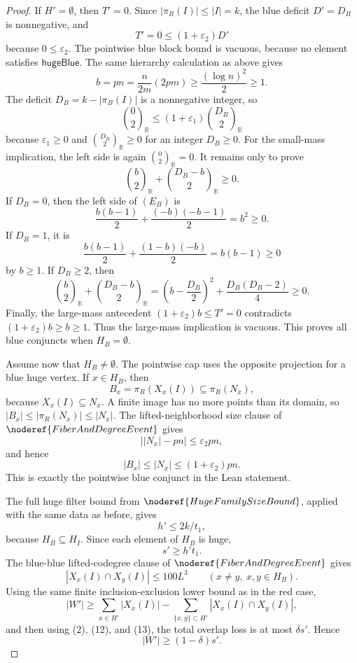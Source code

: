 \begin{proof}
If \(H'=\emptyset\), then \(T'=0\).  Since
\(|\pi_B(I)|\le |I|=k\), the blue deficit \(D'=D_B\) is nonnegative, and
\[
T'=0\le(1+\varepsilon_2)D'
\]
because \(0\le\varepsilon_2\).  The pointwise blue block bound is vacuous,
because no element satisfies \(\mathsf{hugeBlue}\).  The same hierarchy
calculation as above gives
\[
b=pn=\frac{n}{2m}(2pm)\ge\frac{(\log n)^2}{2}\ge1.
\]
The deficit \(D_B=k-|\pi_B(I)|\) is a nonnegative integer, so
\[
\binom{0}{2}_{\mathbb R}
\le(1+\varepsilon_1)\binom{D_B}{2}_{\mathbb R}
\]
because \(\varepsilon_1\ge0\) and
\(\binom{D_B}{2}_{\mathbb R}\ge0\) for an integer \(D_B\ge0\).
For the small-mass implication, the left side is again
\(\binom02_{\mathbb R}=0\).  It remains only to prove
\[
\binom b2_{\mathbb R}+\binom{D_B-b}{2}_{\mathbb R}\ge0. \tag{E_B}
\]
If \(D_B=0\), then the left side of \((E_B)\) is
\[
\frac{b(b-1)}2+\frac{(-b)(-b-1)}2=b^2\ge0.
\]
If \(D_B=1\), it is
\[
\frac{b(b-1)}2+\frac{(1-b)(-b)}2=b(b-1)\ge0
\]
by \(b\ge1\).  If \(D_B\ge2\), then
\[
\binom b2_{\mathbb R}+\binom{D_B-b}{2}_{\mathbb R}
=\left(b-\frac{D_B}{2}\right)^2+\frac{D_B(D_B-2)}4\ge0.
\]
Finally, the large-mass antecedent
\((1+\varepsilon_2)b\le T'=0\) contradicts
\((1+\varepsilon_2)b\ge b\ge1\).  Thus the large-mass implication is
vacuous.  This proves all blue conjuncts when \(H_B=\emptyset\).

Assume now that \(H_B\ne\emptyset\).  The pointwise cap uses the opposite
projection for a blue huge vertex.  If \(x\in H_B\), then
\[
B_x=\pi_R(X_x(I))\subseteq \pi_R(N_x),
\]
because \(X_x(I)\subseteq N_x\).  A finite image has no more points than its
domain, so \(|B_x|\le |\pi_R(N_x)|\le |N_x|\).  The lifted-neighborhood size
clause of \(\noderef{FiberAndDegreeEvent}\) gives
\[
\bigl||N_x|-pn\bigr|\le\varepsilon_2pn,
\]
and hence
\[
|B_x|\le |N_x|\le(1+\varepsilon_2)pn.
\]
This is exactly the pointwise blue conjunct in the Lean statement.

The full huge filter bound from \(\noderef{HugeFamilySizeBound}\), applied
with the same data as before, gives
\[
h'\le2k/t_1, \tag{12}
\]
because \(H_B\subseteq H_I\).  Since each element of \(H_B\) is huge,
\[
s'\ge h't_1. \tag{13}
\]
The blue-blue lifted-codegree clause of \(\noderef{FiberAndDegreeEvent}\)
gives
\[
|X_x(I)\cap X_y(I)|\le100L^3
\qquad(x\ne y,\ x,y\in H_B).
\]
Using the same finite inclusion-exclusion lower bound as in the red case,
\[
|W'|\ge
\sum_{x\in H'}|X_x(I)|
  -\sum_{\{x,y\}\subset H'}|X_x(I)\cap X_y(I)|,
\]
and then using (2), (12), and (13), the total overlap loss is at most
\(\delta s'\).  Hence
\[
|W'|\ge(1-\delta)s'. \tag{14}
\]


\end{proof}
